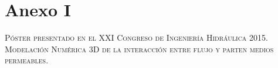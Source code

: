 \renewcommand{\appendixtocname}{Anexo I}
\appendix
\clearpage
 \addappheadtotoc %
\appendixpage
\chapter*{Anexo I}
\begin{center}
\large\scshape P\'oster presentado en el XXI Congreso de Ingenier\'ia Hidr\'aulica 2015.\\
\vspace{2 cm}
Modelaci\'on Num\'erica 3D de la interacci\'on entre flujo y part en medios permeables.
\end{center}

%


